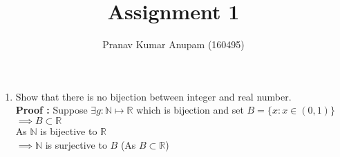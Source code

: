 \documentclass[a4paper,11pt]{article}
\title{Assignment 1}
\author{Pranav Kumar Anupam (160495)}
\begin{document}
\maketitle
\begin{enumerate}
\item Show that there is no bijection between integer and real number.\\ \textbf{Proof :} Suppose $\exists g:\mathbb{N}\mapsto\mathbb{R}$ which is bijection and set $B =\{x:x\in(0,1)\}$
\\ $\implies B\subset\mathbb{R}$ \\As $\mathbb{N}$ is bijective to $\mathbb{R}$ \\$\implies\mathbb{N}$ is surjective to $B$ (As $B\subset\mathbb{R}$)
\end{enumerate}
\end{document}
